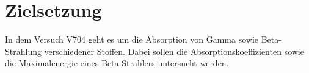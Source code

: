 \section{Zielsetzung} 

\begin{flushleft}
    In dem Versuch V704 geht es um die Absorption von Gamma sowie Beta-Strahlung verschiedener Stoffen. 
    Dabei sollen die Absorptionskoeffizienten sowie die Maximalenergie eines Beta-Strahlers untersucht werden.
\end{flushleft}